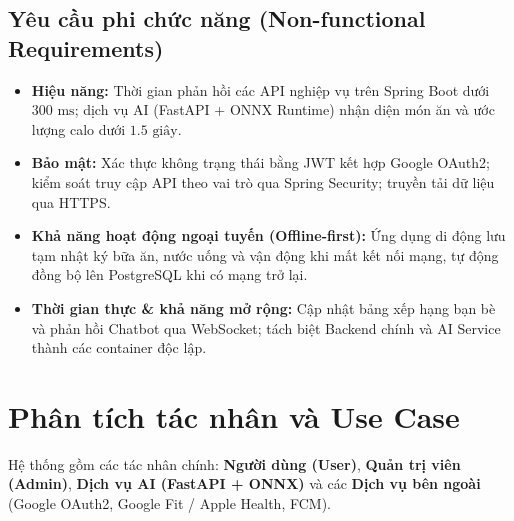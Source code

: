\documentclass[../main.tex]{subfiles}
\begin{document}
\subsection{Yêu cầu phi chức năng (Non-functional Requirements)}

\begin{itemize}
    \item \textbf{Hiệu năng:} Thời gian phản hồi các API nghiệp vụ trên Spring Boot dưới $300\text{ ms}$; dịch vụ AI (FastAPI + ONNX Runtime) nhận diện món ăn và ước lượng calo dưới $1.5\text{ giây}$.
    \item \textbf{Bảo mật:} Xác thực không trạng thái bằng JWT kết hợp Google OAuth2; kiểm soát truy cập API theo vai trò qua Spring Security; truyền tải dữ liệu qua HTTPS.
    \item \textbf{Khả năng hoạt động ngoại tuyến (Offline-first):} Ứng dụng di động lưu tạm nhật ký bữa ăn, nước uống và vận động khi mất kết nối mạng, tự động đồng bộ lên PostgreSQL khi có mạng trở lại.
    \item \textbf{Thời gian thực \& khả năng mở rộng:} Cập nhật bảng xếp hạng bạn bè và phản hồi Chatbot qua WebSocket; tách biệt Backend chính và AI Service thành các container độc lập.
\end{itemize}

\section{Phân tích tác nhân và Use Case}
\label{sec:3.2}

Hệ thống gồm các tác nhân chính: \textbf{Người dùng (User)}, \textbf{Quản trị viên (Admin)}, \textbf{Dịch vụ AI (FastAPI + ONNX)} và các \textbf{Dịch vụ bên ngoài} (Google OAuth2, Google Fit / Apple Health, FCM).
\end{document}
